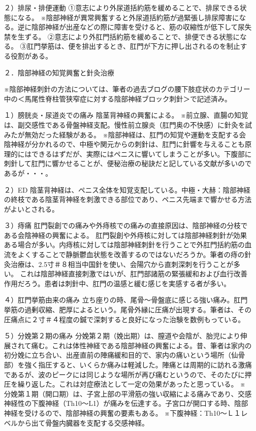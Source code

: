 ２）排尿・排便運動
①意志により外尿道括約筋を緩めることで、排尿できる状態になる。
※陰部神経が異常興奮すると外尿道括約筋が過緊張し排尿障害になる。逆に陰部神経が出産などの際に障害を受けると、筋の収縮性が低下して尿失禁を生ずる。
②意志により外肛門括約筋を緩めることで、排便できる状態になる。
③肛門挙筋は、便を排出するとき、肛門が下方に押し出されるのを制止する役割がある。

２．陰部神経の知覚興奮と針灸治療

※陰部神経刺針の方法については、筆者の過去ブログの腰下肢症状のカテゴリー中の＜馬尾性脊柱管狭窄症に対する陰部神経ブロック刺針＞で記述済み。

１）膀胱炎・尿道炎での痛み
陰茎背神経の興奮による。
※前立腺、直腸の知覚は、副交感性である骨盤神経支配。慢性前立腺炎（肛門奥の不快感）に針灸を試みたが無効だった経験がある。
※陰部神経は、肛門の知覚や運動を支配する会陰神経が分かれるので、中極や関元からの刺針は、肛門に針響を与えることも原理的にはできるはずだが、実際にはペニスに響いてしまうことが多い。下腹部に刺針して肛門に響かせることが、便秘治療の秘訣だと記している文献が多いのであるが・・・。

２）ED
陰茎背神経は、ペニス全体を知覚支配している。中極・大赫：陰部神経の終枝である陰茎背神経を刺激できる部位であり、ペニス先端まで響かせる方法がよいとされる。　

３）痔痛
肛門裂創での痛みや外痔核での痛みの直接原因は、陰部神経の分枝である会陰神経の興奮による。
肛門裂創や外痔核に対しては陰部神経刺針が効果ある場合が多い。内痔核に対しては陰部神経刺針を行うことで外肛門括約筋の血流をよくすることで静脈鬱血状態を改善するのではないだろうか。筆者の痔の針灸治療は、2.5寸＃８相当中国針を使い、会陽穴から直刺深刺を行うことが多い。
これは陰部神経直接刺激ではいが、肛門部諸筋の緊張緩和および血行改善作用だろう。患者は刺針中、肛門の温感と緩む感じを実感する者が多い。

４）肛門挙筋由来の痛み
立ち座りの時、尾骨～骨盤底に感じる強い痛み。肛門挙筋の過剰収縮、肥厚によるという。尾骨外縁に圧痛が出現する。筆者は、その圧痛点に２寸＃４程度の鍼で深刺すると良好になった治験を数例もっている。

５）分娩第２期の痛み
分娩第２期（娩出期）は、膣道や会陰が、胎児により伸展されて痛む。これは体性神経である陰部神経の興奮による。昔、筆者は家内の初分娩に立ち合い、出産直前の陣痛緩和目的で、家内の痛いという場所（仙骨部）を強く指圧すると、いくらか痛みは軽減した。陣痛とは周期的に訪れる激痛であるが、波のピークには同じような場所が再び痛むというので、そのたびに押圧を繰り返した。これは対症療法として一定の効果があったと思っている。
※分娩第１期（開口期）は、子宮上部の平滑筋の強い収縮による痛みであり、交感神経性の下腹神経（Th10～L1）が痛みを伝達する。子宮口が開口する時、陰部神経を受けるので、陰部神経の興奮の要素もある。
※下腹神経：Th10～Ｌ１レベルから出て骨盤内臓器を支配する交感神経。

